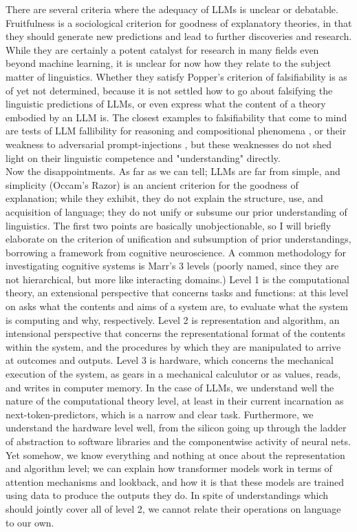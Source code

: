 There are several criteria where the adequacy of LLMs is unclear or debatable. Fruitfulness is a sociological criterion for goodness of explanatory theories, in that they should generate new predictions and lead to further discoveries and research. While they are certainly a potent catalyst for research in many fields even beyond machine learning, it is unclear for now how they relate to the subject matter of linguistics. Whether they satisfy Popper's criterion of falsifiability is as of yet not determined, because it is not settled how to go about falsifying the linguistic predictions of LLMs, or even express what the content of a theory embodied by an LLM is. The closest examples to falsifiability that come to mind are tests of LLM fallibility for reasoning and compositional phenomena \citep{dziriFaithFateLimits2023}, or their weakness to adversarial prompt-injections \citep{RileyGoodsideGoodside2022}, but these weaknesses do not shed light on their linguistic competence and "understanding" directly.\\

Now the disappointments. As far as we can tell; LLMs are far from simple, and simplicity (Occam's Razor) is an ancient criterion for the goodness of explanation; while they exhibit, they do not explain the structure, use, and acquisition of language; they do not unify or subsume our prior understanding of linguistics. The first two points are basically unobjectionable, so I will briefly elaborate on the criterion of unification and subsumption of prior understandings, borrowing a framework from cognitive neuroscience. A common methodology for investigating cognitive systems is Marr's 3 levels \citep{marrVisionComputationalInvestigation2010} (poorly named, since they are not hierarchical, but more like interacting domains.) Level 1 is the computational theory, an extensional perspective that concerns tasks and functions: at this level on asks what the contents and aims of a system are, to evaluate what the system is computing and why, respectively. Level 2 is representation and algorithm, an intensional perspective that concerns the representational format of the contents within the system, and the procedures by which they are manipulated to arrive at outcomes and outputs. Level 3 is hardware, which concerns the mechanical execution of the system, as gears in a mechanical calculutor or as values, reads, and writes in computer memory. In the case of LLMs, we understand well the nature of the computational theory level, at least in their current incarnation as next-token-predictors, which is a narrow and clear task. Furthermore, we understand the hardware level well, from the silicon going up through the ladder of abstraction to software libraries and the componentwise activity of neural nets. Yet somehow, we know everything and nothing at once about the representation and algorithm level; we can explain how transformer models work in terms of attention mechanisms and lookback, and how it is that these models are trained using data to produce the outputs they do. In spite of understandings which should jointly cover all of level 2, we cannot relate their operations on language to our own.

